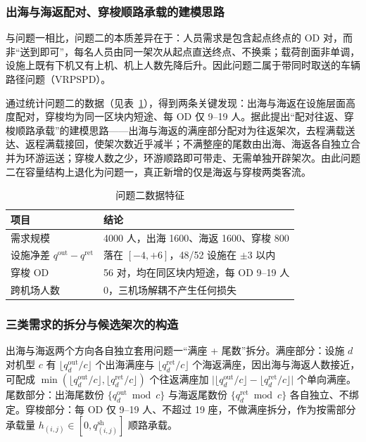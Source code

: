 \documentclass[UTF8,zihao=-4]{ctexart}
\numberwithin{figure}{section}
\numberwithin{table}{section}
\begin{document}
\subsubsection{出海与海返配对、穿梭顺路承载的建模思路}

与问题一相比，问题二的本质差异在于：人员需求是包含起点终点的 OD 对，而非“送到即可”，每名人员由同一架次从起点直送终点、不换乘；载荷剖面非单调，设施上既有下机又有上机、机上人数先降后升。因此问题二属于带同时取送的车辆路径问题（VRPSPD）\cite{ref:toth}。

通过统计问题二的数据（见表~\ref{tab:q2data}），得到两条关键发现：出海与海返在设施层面高度配对，穿梭均为同一区块内短途、每 OD 仅 9--19 人。据此提出“配对往返、穿梭顺路承载”的建模思路——出海与海返的满座部分配对为往返架次，去程满载送达、返程满载接回，使架次数近乎减半；不满整座的尾数由出海、海返各自独立合并为环游运送；穿梭人数之少，环游顺路即可带走、无需单独开辟架次。由此问题二在容量结构上退化为问题一，真正新增的仅是海返与穿梭两类客流。

\begin{table}[H]
  \centering
  \caption{问题二数据特征}
  \label{tab:q2data}
  \begin{tabular}{ll}
    \toprule
    项目 & 结论 \\
    \midrule
    需求规模 & 4000 人，出海 1600、海返 1600、穿梭 800 \\
    设施净差 $q^{\mathrm{out}}-q^{\mathrm{ret}}$ & 落在 $[-4,+6]$，48/52 设施在 $\pm3$ 以内 \\
    穿梭 OD & 56 对，均在同区块内短途，每 OD 9--19 人 \\
    跨机场人数 & 0，三机场解耦不产生任何损失 \\
    \bottomrule
  \end{tabular}
\end{table}

\subsubsection{三类需求的拆分与候选架次的构造}

出海与海返两个方向各自独立套用问题一“满座 + 尾数”拆分。满座部分：设施 $d$ 对机型 $c$ 有 $\lfloor q_d^{\mathrm{out}}/c\rfloor$ 个出海满座与 $\lfloor q_d^{\mathrm{ret}}/c\rfloor$ 个海返满座，因出海与海返人数接近，可配成 $\min(\lfloor q_d^{\mathrm{out}}/c\rfloor,\lfloor q_d^{\mathrm{ret}}/c\rfloor)$ 个往返满座加 $\big|\lfloor q_d^{\mathrm{out}}/c\rfloor-\lfloor q_d^{\mathrm{ret}}/c\rfloor\big|$ 个单向满座。尾数部分：出海尾数份 $\{q_d^{\mathrm{out}}\bmod c\}$ 与海返尾数份 $\{q_d^{\mathrm{ret}}\bmod c\}$ 各自独立、不绑定。穿梭部分：每 OD 仅 9--19 人、不超过 19 座，不做满座拆分，作为按需部分承载量 $h_{(i,j)}\in[0,q^{\mathrm{sh}}_{(i,j)}]$ 顺路承载。
\end{document}
